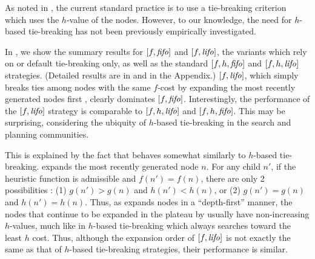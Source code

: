 \label{sec:noh}
As noted in , the current standard practice is to use a tie-breaking criterion which uses the $h$-value of the nodes. However, to our knowledge, the need for $h$-based tie-breaking has not been previously empirically investigated.

In , we show the summary results for $[f, {\text{\textit{fifo}}}]$ and $[f, {\text{\textit{lifo}}}]$, the
\astar variants which rely on \fifo or \lifo default tie-breaking only, as well as the standard $[f, h, {\text{\textit{fifo}}}]$ and $[f, h, {\text{\textit{lifo}}}]$ strategies.
(Detailed results are in
 and  in the Appendix.)
$[f,{\text{\textit{lifo}}}]$, which simply breaks ties among nodes with the same
$f$-cost by expanding the most recently generated nodes first
\cite{korf1985depth}, clearly dominates $[f,{\text{\textit{fifo}}}]$.  Interestingly,
the performance of the $[f,{\text{\textit{lifo}}}]$ strategy is comparable to
$[f,h,{\text{\textit{lifo}}}]$ and $[f,h,{\text{\textit{fifo}}}]$.  This may be surprising, considering
the ubiquity of $h$-based tie-breaking in the search and planning
communities.

This is explained by the fact that 
\lifo behaves somewhat similarly to $h$-based tie-breaking.
\lifo expands the most recently generated node $n$.
For any child $n'$, 
if the heuristic function is admissible and $f(n') = f(n)$, there are only 2 possibilities :
(1) $g(n') > g(n)$ and $h(n') < h(n)$, or
(2) $g(n') = g(n)$ and $h(n') = h(n)$.
Thus, as \lifo expands nodes in a ``depth-first'' manner,
the nodes that continue to be expanded in the plateau by \lifo usually   %
have non-increasing $h$-values,
much like in $h$-based tie-breaking which always searches toward the least $h$ cost.
Thus, although the expansion order of $[f,{\text{\textit{lifo}}}]$ is not exactly the same as that of $h$-based tie-breaking strategies,
their performance is similar.




